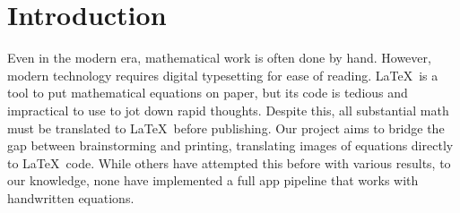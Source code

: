 \section{Introduction}
\label{sec:intro}
Even in the modern era, mathematical work is often done by hand. However, modern technology requires digital typesetting for ease of reading. \LaTeX\ is a tool to put mathematical equations on paper, but its code is tedious and impractical to use to jot down rapid thoughts. Despite this, all substantial math must be translated to \LaTeX\ before publishing. Our project aims to bridge the gap between brainstorming and printing, translating images of equations directly to \LaTeX\ code. While others have attempted this before with various results\cite{Peng, Genthial, Wang, Wang02}, to our knowledge, none have implemented a full app pipeline that works with handwritten equations.
